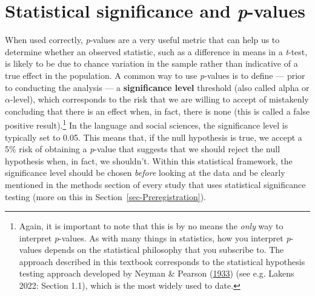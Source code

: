 \documentclass[
  letterpaper,
  DIV=11,
  numbers=noendperiod]{scrreprt}
\newcounter{none} %
\begin{document}
\section{\texorpdfstring{Statistical significance and
\emph{p}-values}{Statistical significance and p-values}}\label{sec-PValues}

When used correctly, \emph{p}‑values are a very useful metric that can
help us to determine whether an observed statistic, such as a difference
in means in a \emph{t}-test, is likely to be due to chance variation in
the sample rather than indicative of a true effect in the population. A
common way to use \emph{p}‑values is to define --- prior to conducting
the analysis --- a \textbf{significance level} threshold (also called
alpha or \(\alpha\)-level), which corresponds to the risk that we are
willing to accept of mistakenly concluding that there is an effect when,
in fact, there is none (this is called a false positive
result).\footnote{Again, it is important to note that this is by no
  means the \emph{only} way to interpret \emph{p}-values. As with many
  things in statistics, how you interpret \emph{p}-values depends on the
  statistical philosophy that you subscribe to. The approach described
  in this textbook corresponds to the statistical hypothesis testing
  approach developed by Neyman \& Pearson
  (\href{https://lakens.github.io/statistical_inferences/references.html\#ref-neyman_problem_1933}{1933})
  (see e.g. Lakens 2022: Section 1.1), which is the most widely used to
  date.} In the language and social sciences, the significance level is
typically set to 0.05. This means that, if the null hypothesis is true,
we accept a 5\% risk of obtaining a \emph{p}-value that suggests that we
should reject the null hypothesis when, in fact, we shouldn't. Within
this statistical framework, the significance level should be chosen
\emph{before} looking at the data and be clearly mentioned in the
methods section of every study that uses statistical significance
testing (more on this in Section~\ref{sec-Preregistration}).
\end{document}
